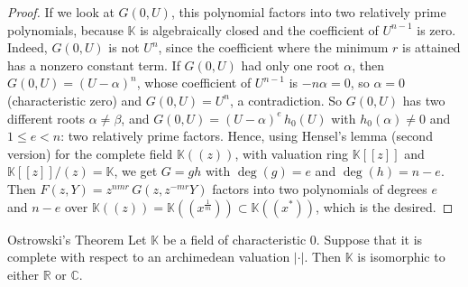 \documentclass[11pt]{article}
\begin{document}
\begin{proof}
If we look at $G(0, U)$, this polynomial factors into two relatively prime polynomials, because $\mathbb{K}$ is algebraically closed and the coefficient of $U^{n-1}$ is zero. Indeed, $G(0, U)$ is not $U^n$, since the coefficient where the minimum $r$ is attained has a nonzero constant term. If $G(0, U)$ had only one root $\alpha$, then $G(0, U) = (U - \alpha)^n$, whose coefficient of $U^{n-1}$ is $-n\alpha = 0$, so $\alpha = 0$ (characteristic zero) and $G(0, U) = U^n$, a contradiction. So $G(0, U)$ has two different roots $\alpha \neq \beta$, and $G(0, U) = (U - \alpha)^e\, h_0(U)$ with $h_0(\alpha) \neq 0$ and $1 \leq e < n$: two relatively prime factors. Hence, using Hensel's lemma (second version) for the complete field $\mathbb{K}((z))$, with valuation ring $\mathbb{K}[[z]]$ and $\mathbb{K}[[z]]/(z) = \mathbb{K}$, we get $G = gh$ with $\deg(g) = e$ and $\deg(h) = n - e$. Then $F(z, Y) = z^{nmr}\, G(z, z^{-mr}Y)$ factors into two polynomials of degrees $e$ and $n - e$ over $\mathbb{K}((z)) = \mathbb{K}((x^{\frac1m})) \subset \mathbb{K}((x^*))$, which is the desired.
\end{proof}

\begin{thmbox}{Ostrowski's Theorem}
Let $\mathbb{K}$ be a field of characteristic $0$. Suppose that it is complete with respect to an archimedean valuation $|\cdot|$. Then $\mathbb{K}$ is isomorphic to either $\mathbb{R}$ or $\mathbb{C}$.
\end{thmbox}
\end{document}
